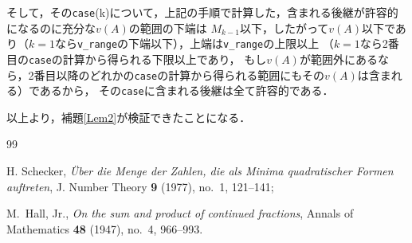 \documentclass[10pt,a4paper]{ujarticle}
\theoremstyle{definition}
\begin{document}
そして，その\verb|case|(k)について，上記の手順で計算した，含まれる後継が許容的になるのに充分な$v(A)$の範囲の下端は
$M_{k - 1}$以下，したがって$v(A)$以下であり（$k=1$なら\verb|v_range|の下端以下），上端は\verb|v_range|の上限以上
（$k=1$なら2番目の\verb|case|の計算から得られる下限以上であり，
もし$v(A)$が範囲外にあるなら，2番目以降のどれかの\verb|case|の計算から得られる範囲にもその$v(A)$は含まれる）であるから，
その\verb|case|に含まれる後継は全て許容的である．

以上より，補題\ref{Lem2}が検証できたことになる．

\begin{thebibliography}{99}
\raggedright
{} 
H. Schecker, 
{\it \"Uber die Menge der Zahlen, die als Minima quadratischer Formen auftreten}, 
J. Number Theory {\bf 9} (1977), no.~1, 121--141;

M.~Hall, Jr.,
\textit{On the sum and product of continued fractions},
Annals of Mathematics \textbf{48} (1947), no.~4, 966--993.
\end{thebibliography}
\end{document}
